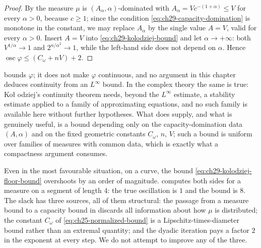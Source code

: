 \begin{proof}
By  the measure \(\mu\) is
\((A_\alpha,\alpha)\)-dominated with
\(A_\alpha=Vc^{-(1+\alpha)}\leq V\) for every \(\alpha>0\), because
\(c\geq1\); since the condition \eqref{eq:ch29-capacity-domination} is
monotone in the constant, we may replace \(A_\alpha\) by the single value
\(A=V\), valid for every \(\alpha>0\).  Insert \(A=V\) into
\eqref{eq:ch29-kolodziej-bound} and let \(\alpha\to+\infty\): both
\(V^{1/\alpha}\to1\) and \(2^{n/\alpha^2}\to1\), while the left-hand side
does not depend on \(\alpha\).  Hence
\(\operatorname{osc}\varphi\leq(C_\omega+nV)+2\).
\end{proof}

\begin{remark}
\label{rem:ch29-linfty-scope}
 bounds \(\varphi\); it does not make
\(\varphi\) continuous, and no argument in this chapter deduces continuity
from an \(L^\infty\) bound.  In the complex theory the same is true: Ko\l
odziej's continuity theorem needs, beyond the \(L^\infty\) estimate, a
stability estimate applied to a family of approximating equations, and no
such family is available here without further hypotheses.  What
 does supply, and what is genuinely useful,
is a bound depending only on the capacity-domination data \((A,\alpha)\) and
on the fixed geometric constants \(C_\omega\), \(n\), \(V\); such a bound is
uniform over families of measures with common data, which is exactly what a
compactness argument consumes.
\end{remark}

\begin{remark}
\label{rem:ch29-linfty-slack}
Even in the most favourable situation, on a curve, the bound
\eqref{eq:ch29-kolodziej-floor-bound} overshoots by an order of magnitude.
 computes both sides for a measure on a segment
of length \(4\): the true oscillation is \(1\) and the bound is \(8\).  The
slack has three sources, all of them structural: the passage from a measure
bound to a capacity bound in  discards all
information about how \(\mu\) is distributed; the constant \(C_\omega\) of
\eqref{eq:ch25-normalized-bound} is a Lipschitz-times-diameter bound rather
than an extremal quantity; and the dyadic iteration pays a factor \(2\) in
the exponent at every step.  We do not attempt to improve any of the three.
\end{remark}

